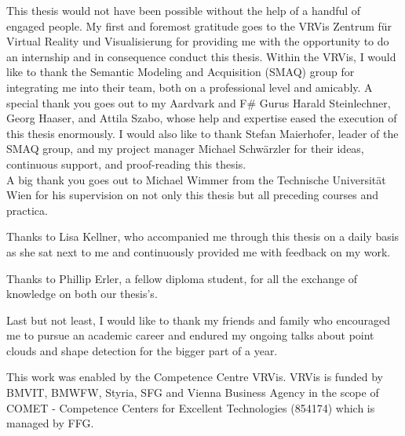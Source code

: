 \documentclass[draft,final]{vutinfth} %
\begin{document}
\frontmatter %

\addstatementpage


\begin{acknowledgements*}

This thesis would not have been possible without the help of a handful of engaged people. 
My first and foremost gratitude goes to the VRVis Zentrum für Virtual Reality und Visualisierung for providing me with the opportunity to do an internship and in consequence conduct this thesis. Within the VRVis, I would like to thank the Semantic Modeling and Acquisition (SMAQ) group for integrating me into their team, both on a professional level and amicably. A special thank you goes out to my Aardvark and F\# Gurus Harald Steinlechner, Georg Haaser, and Attila Szabo, whose help and expertise eased the execution of this thesis enormously. 
I would also like to thank Stefan Maierhofer, leader of the SMAQ group, and my project manager Michael Schwärzler for their ideas, continuous support, and proof-reading this thesis. 
\\
A big thank you goes out to Michael Wimmer from the Technische Universität Wien for his supervision on not only this thesis but all preceding courses and practica. 

Thanks to Lisa Kellner, who accompanied me through this thesis on a daily basis as she sat next to me and continuously provided me with feedback on my work. 

Thanks to Phillip Erler, a fellow diploma student, for all the exchange of knowledge on both our thesis’s. 

Last but not least, I would like to thank my friends and family who encouraged me to pursue an academic career and endured my ongoing talks about point clouds and shape detection for the bigger part of a year.

This work was enabled by the Competence Centre VRVis. VRVis is funded by BMVIT, BMWFW, Styria, SFG and Vienna Business Agency in the scope of COMET - Competence Centers for Excellent Technologies (854174) which is managed by FFG.

\end{acknowledgements*}
\end{document}
